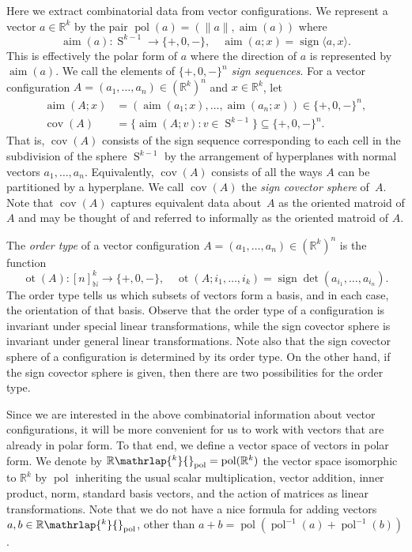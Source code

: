 \documentclass[JEP,XML,SOM,Unicode,NoFloatCountersInSection,published]{cedram}
\theoremstyle{remark}
\let\mb\mathbb
\let\df\emph
\DeclareMathOperator{\sign}{sign}
\DeclareMathOperator{\sphere}{S}
\newcommand{\Rpol}[1]{\mb{R}\mathrlap{{}^{#1}}{}_\text{pol}}
\DeclareMathOperator{\pol}{pol}
\DeclareMathOperator{\aim}{aim}
\DeclareMathOperator{\cov}{cov}
\DeclareMathOperator{\ot}{ot}
\begin{document}
Here we extract combinatorial data from vector configurations.
We represent a vector $a \in \mb{R}^k$ by the pair $\pol(a) = (\|a\|,\aim (a))$ where
\[ \aim (a) : \sphere^{k-1} \to \{+,0,-\}, \quad \aim (a; x) = \sign \langle a,x \rangle.\]
This is effectively the polar form of $a$ where the direction of $a$ is represented by $\aim(a)$.
We call the elements of $\{+,0,-\}^n$ \df{sign sequences}.
For a vector configuration $A = (a_1,\dots,a_n) \in (\mb{R}^k)^n$ and $x \in \mb{R}^k$, let
\begin{align*}
\aim (A;x) &= (\aim(a_1;x),\dots,\aim(a_n;x)) \in \{+,0,-\}^n, \\
\cov (A) &= \bigl\{ \aim (A; v) :v \in \sphere^{k-1} \bigr\} \subseteq \{+,0,-\}^n.
\end{align*}
That is, $\cov(A)$ consists of the sign sequence corresponding to each cell in the subdivision of the sphere $\sphere^{k-1}$ by the arrangement of hyperplanes with normal vectors $a_1,\dots,a_n$.
Equivalently, $\cov(A)$ consists of all the ways $A$ can be partitioned by a hyper\-plane.
We call $\cov(A)$ the \df{sign covector sphere} of~$A$.
Note that $\cov(A)$ captures equivalent data about~$A$ as the oriented matroid of $A$ and may be thought of and referred to informally as the oriented matroid of $A$.

The \df{order type} of a vector configuration $A = (a_1,\dots,a_n) \in (\mb{R}^k)^n$ is the function
\[ \ot(A): [n]_\mb{N}^k \to \{+,0,-\}, \quad \ot(A;i_1,\dots,i_k) = \sign\det(a_{i_1},\dots,a_{i_n}). \]
The order type tells us which subsets of vectors form a basis, and in each case, the orientation of that basis.
Observe that the order type of a configuration is invariant under special linear transformations, while the sign covector sphere is invariant under general linear transformations.
Note also that the sign covector sphere of a configuration is determined by its order type. On the other hand, if the sign covector sphere is given, then there are two possibilities for the order type.

Since we are interested in the above combinatorial information about vector configurations, it will be more convenient for us to work with vectors that are already in polar form. To that end, we define a vector space of vectors in polar form.
We denote by $\Rpol{k} = \pol(\mb{R}^k)$ the vector space isomorphic to $\mb{R}^k$ by $\pol$ inheriting the usual scalar multiplication, vector addition, inner product, norm, standard basis vectors, and the action of matrices as linear transformations. Note that we do not have a nice formula for adding vectors $a,b \in \Rpol{k}$, other than $a+b = \pol(\pol^{-1}(a)+\pol^{-1}(b))$.
\end{document}
